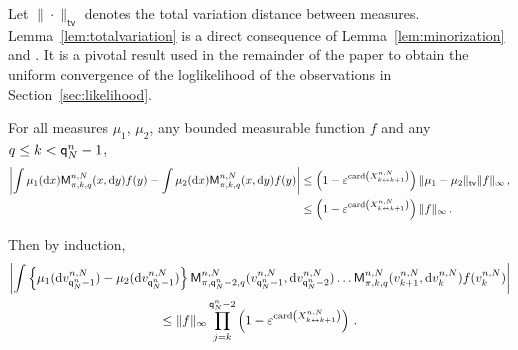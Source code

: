 Let $\|\cdot\|_{\mathsf{tv}}$ denotes the total variation distance between measures. Lemma~\ref{lem:totalvariation} is a direct consequence of Lemma~\ref{lem:minorization} and \cite{}. It is a pivotal result used in the remainder of the paper to obtain the uniform convergence of the loglikelihood of the observations in Section~\ref{sec:likelihood}.
\begin{lemma}
\label{lem:totalvariation}
For all measures $\mu_1$, $\mu_2$, any bounded measurable function $f$ and any $q\le k < {\mathsf{q}}^{n}_{N}-1$,
\begin{align*}
\left|\int \mu_1 (\mathrm{d} x)\mathsf{M}^{n,N}_{\pi,k,q}(x,\mathrm{d} y)f(y) - \int \mu_2 (\mathrm{d} x)\mathsf{M}^{n,N}_{\pi,k,q}(x,\mathrm{d} y)f(y) \right|&\le \left(1-\varepsilon^{\mathrm{card}\left(X^{n,N}_{k\leftrightarrow k+1}\right)}\right)\|\mu_1-\mu_2\|_{\mathsf{tv}}\|f\|_{\infty}\,,\\
&\le \left(1-\varepsilon^{\mathrm{card}\left(X^{n,N}_{k\leftrightarrow k+1}\right)}\right)\|f\|_{\infty}\,.
\end{align*}
\end{lemma}
Then by induction,
\begin{multline}
\label{eq:exp:forgetting}
\left|\int \left\{\mu_1(\mathrm{d} v^{n,N}_{{\mathsf{q}}^{n}_{N}-1})-\mu_2(\mathrm{d} v^{n,N}_{{\mathsf{q}}^{n}_{N}-1})\right\} \mathsf{M}^{n,N}_{\pi,{\mathsf{q}}^{n}_{N}-2,q}(v_{{\mathsf{q}}^{n}_{N}-1}^{n,N},\mathrm{d} v_{{\mathsf{q}}^{n}_{N}-2}^{n,N})\ldots\mathsf{M}^{n,N}_{\pi,k,q}(v_{k+1}^{n,N},\mathrm{d} v_k^{n,N})f(v_k^{n,N})\right|\\
\le \|f\|_{\infty}\prod_{j=k}^{{\mathsf{q}}^{n}_{N}-2}\left(1-\varepsilon^{\mathrm{card}\left(X^{n,N}_{k\leftrightarrow k+1}\right)}\right)\,.
\end{multline}



